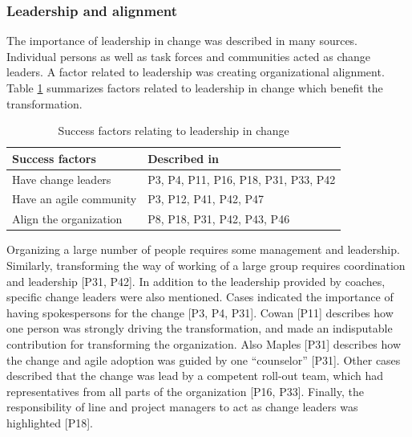 \subsubsection{Leadership and alignment}

The importance of leadership in change was described in many sources. Individual
persons as well as task forces and communities acted as change leaders. A factor
related to leadership was creating organizational alignment.
Table \ref{table:success_changeleaders} summarizes factors related to leadership
in change which benefit the transformation.

\begin{table}[h]
    \centering
    \begin{tabular}{ >{\raggedright\arraybackslash}p{}
                     >{\raggedright\arraybackslash}p{} }
        \toprule
        Success factors  &  Described in \\
        \midrule
        Have change leaders  &
                P3, P4, P11, P16, P18, P31, P33, P42  \\
        Have an agile community  &
                P3, P12, P41, P42, P47  \\
        Align the organization  &
                P8, P18, P31, P42, P43, P46  \\
        \bottomrule
    \end{tabular}
    \caption{Success factors relating to leadership in change}
    \label{table:success_changeleaders}
\end{table}


Organizing a large number of people requires some management and leadership.
Similarly, transforming the way of working of a large group requires coordination
and leadership [P31, P42]. In addition to the leadership provided by coaches,
specific change leaders were also mentioned. Cases indicated the importance of
having spokespersons for the change [P3, P4, P31]. Cowan [P11] describes how one
person was strongly driving the transformation, and made an indisputable
contribution for transforming the organization. Also Maples [P31] describes how
the change and agile adoption was guided by one ``counselor'' [P31]. Other cases
described that the change was lead by a competent roll-out team, which had
representatives from all parts of the organization [P16, P33]. Finally, the
responsibility of line and project managers to act as change leaders was
highlighted [P18].

